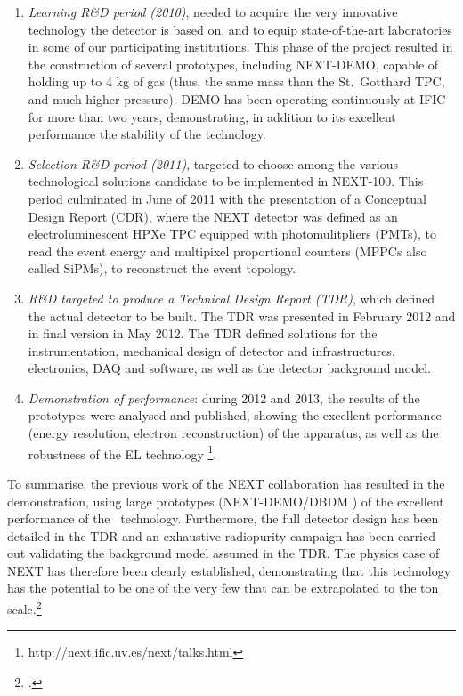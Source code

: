 \begin{enumerate}
\item {\em Learning R\&D period (2010)}, needed to acquire the very innovative technology the detector is based on, and to equip state-of-the-art laboratories in some of our participating institutions. This phase of the project resulted in the construction of several prototypes, including NEXT-DEMO, capable of holding up to 4 kg of gas (thus, the same mass than  the St.~Gotthard TPC, and much higher pressure). DEMO has been operating continuously at IFIC for more than two years, demonstrating, in addition to its excellent performance the stability of the technology.  

\item {\em Selection R\&D period (2011)}, targeted to choose among the various technological solutions candidate to be implemented in NEXT-100. This period culminated in June of 2011 with the presentation of a Conceptual Design Report (CDR), where the NEXT detector was defined as an electroluminescent HPXe TPC equipped with photomulitpliers (PMTs),  to read the event energy and multipixel proportional counters (MPPCs also called SiPMs), to reconstruct the event topology. 

\item {\em R\&D targeted to produce a Technical Design Report (TDR)}, which defined the actual detector to be built. The TDR was presented in February 2012 and in final version in May 2012. The TDR defined solutions for the instrumentation, mechanical design of detector and infrastructures, electronics, DAQ and software, as well as the detector background model. 

\item {\em Demonstration of performance}: during 2012 and 2013, the results of the prototypes were analysed and published, showing the excellent performance (energy resolution, electron reconstruction) of the apparatus, as well as the robustness of the EL technology \footnote{http://next.ific.uv.es/next/talks.html}.  
\end{enumerate}

To summarise, the previous work of the NEXT collaboration has resulted in the demonstration, using large prototypes (NEXT-DEMO/DBDM ) of the excellent performance of the \HPXE\ technology. Furthermore, the full detector design has been detailed in the TDR and an exhaustive radiopurity campaign has been carried out  validating the background model assumed in the TDR.  The physics case of NEXT has therefore been clearly established, demonstrating that this technology has the potential to be one of the very few that can be extrapolated to the ton scale.\footcite{GomezCadenas:2012jv} 

